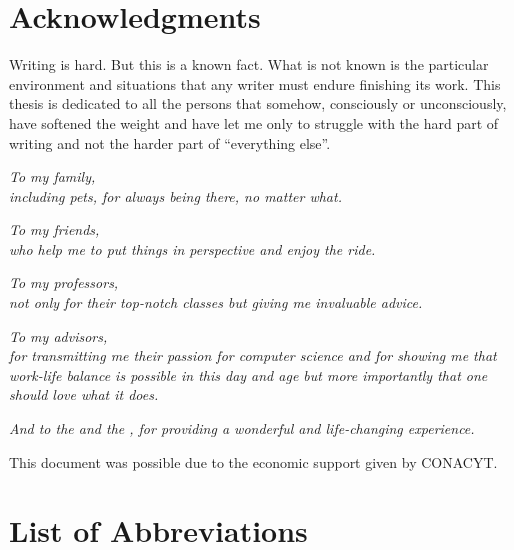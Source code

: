 \documentclass[
  12pt,
  openany]{book}
\begin{document}
\hypertarget{acknowledgments}{%
\chapter*{Acknowledgments}\label{acknowledgments}}

Writing is hard. But this is a known fact. What is not known is the particular environment and situations that any writer must endure finishing its work. This thesis is dedicated to all the persons that somehow, consciously or unconsciously, have softened the weight and have let me only to struggle with the hard part of writing and not the harder part of ``everything else''.

\begin{flushleft}
\emph{To my family,\\including pets, for always being there, no matter what.}

\emph{To my friends,\\who help me to put things in perspective and enjoy the ride.}

\emph{To my professors,\\not only for their top-notch classes but giving me invaluable advice.}

\emph{To my advisors,\\for transmitting me their passion for computer science and for
showing me that work-life balance is possible in this day and age but more importantly that one should love what it does.}

\emph{And to the  and the , for providing a wonderful and life-changing experience.}
\end{flushleft}

\begin{flushright}
\footnotesize{This document was possible due to the economic support given by CONACYT.}
\end{flushright}

\tableofcontents

\listoffigures

\listoftables

\hypertarget{list-of-abbreviations}{%
\chapter*{List of Abbreviations}\label{list-of-abbreviations}}
\end{document}
